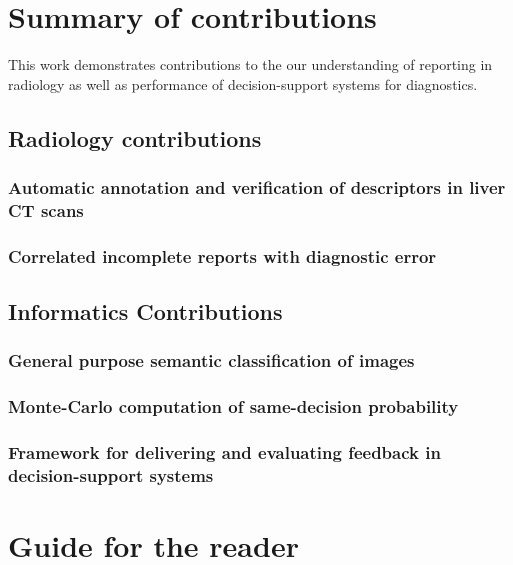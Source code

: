\section{Summary of contributions}
This work demonstrates contributions to the our understanding of reporting in radiology as well as performance of decision-support systems for diagnostics.

\subsection{Radiology contributions}
\subsubsection{Automatic annotation and verification of descriptors in liver CT scans}
\subsubsection{Correlated incomplete reports with diagnostic error}

\subsection{Informatics Contributions}
\subsubsection{General purpose semantic classification of images}
\subsubsection{Monte-Carlo computation of same-decision probability}
\subsubsection{Framework for delivering and evaluating feedback in decision-support systems}


\section{Guide for the reader}
